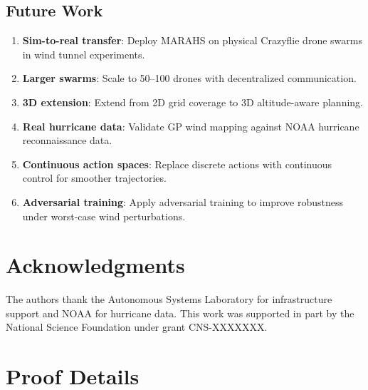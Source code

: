 \documentclass[11pt,twocolumn]{article}
\theoremstyle{definition}
\begin{document}
\subsection{Future Work}

\begin{enumerate}[leftmargin=*]
    \item \textbf{Sim-to-real transfer}: Deploy MARAHS on physical Crazyflie drone swarms in wind tunnel experiments.
    \item \textbf{Larger swarms}: Scale to 50--100 drones with decentralized communication.
    \item \textbf{3D extension}: Extend from 2D grid coverage to 3D altitude-aware planning.
    \item \textbf{Real hurricane data}: Validate GP wind mapping against NOAA hurricane reconnaissance data.
    \item \textbf{Continuous action spaces}: Replace discrete actions with continuous control for smoother trajectories.
    \item \textbf{Adversarial training}: Apply adversarial training to improve robustness under worst-case wind perturbations.
\end{enumerate}

\section*{Acknowledgments}

The authors thank the Autonomous Systems Laboratory for infrastructure support and NOAA for hurricane data. This work was supported in part by the National Science Foundation under grant CNS-XXXXXXX.



\appendix

\section{Proof Details}
\label{app:proofs}
\end{document}
